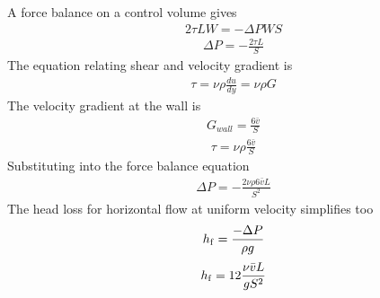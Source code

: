 \documentclass[letterpaper,10pt,english]{sphinxmanual}
\begin{document}
A force balance on a control volume gives
\begin{equation}\label{equation:Rapid_Mix/RM_Derivations:Rapid_Mix/RM_Derivations:78}
\begin{split}2 \tau L W = -\Delta P W S\end{split}
\end{equation}\begin{equation}\label{equation:Rapid_Mix/RM_Derivations:Rapid_Mix/RM_Derivations:79}
\begin{split}\Delta P = -\frac{2 \tau L}{S}\end{split}
\end{equation}
The equation relating shear and velocity gradient is
\begin{equation}\label{equation:Rapid_Mix/RM_Derivations:Rapid_Mix/RM_Derivations:80}
\begin{split}\tau = \nu \rho \frac{du}{dy} = \nu \rho G\end{split}
\end{equation}
The velocity gradient at the wall is
\begin{equation}\label{equation:Rapid_Mix/RM_Derivations:Rapid_Mix/RM_Derivations:81}
\begin{split}G_{wall} = \frac{6 \bar v}{S}\end{split}
\end{equation}\begin{equation}\label{equation:Rapid_Mix/RM_Derivations:Rapid_Mix/RM_Derivations:82}
\begin{split}\tau  = \nu \rho \frac{6 \bar v}{S}\end{split}
\end{equation}
Substituting into the force balance equation
\begin{equation}\label{equation:Rapid_Mix/RM_Derivations:Rapid_Mix/RM_Derivations:83}
\begin{split}\Delta P = -\frac{2 \nu \rho 6 \bar v L}{S^2}\end{split}
\end{equation}
The head loss for horizontal flow at uniform velocity simplifies too
\begin{equation}\label{equation:Rapid_Mix/RM_Derivations:Rapid_Mix/RM_Derivations:84}
\begin{split}h_{{\rm f}} = \frac{-\Delta P}{\rho g}\end{split}
\end{equation}\begin{equation}\label{equation:Rapid_Mix/RM_Derivations:Rapid_Mix/RM_Derivations:85}
\begin{split}h_{{\rm f}} = 12\frac{ \nu \bar v L}{gS^2}\end{split}
\end{equation}
\end{document}
